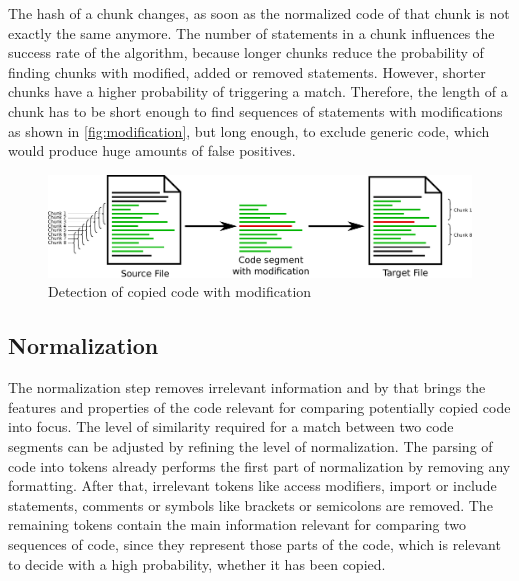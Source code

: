 The hash of a chunk changes, as soon as the normalized code of that chunk is not exactly the same anymore. 
The number of statements in a chunk influences the success rate of the algorithm, because longer chunks reduce the probability of finding chunks with modified, added or removed statements.
However, shorter chunks have a higher probability of triggering a match.
Therefore, the length of a chunk has to be short enough to find sequences of statements with modifications as shown in \autoref{fig:modification}, but long enough, to exclude generic code, which would produce huge amounts of false positives.

\begin{figure}[h]
	\centering
	\includegraphics[width=\linewidth]{figures/modification.pdf}
	\caption{Detection of copied code with modification}\label{fig:modification}
\end{figure}

\subsection{Normalization}\label{section:approach/creating_index/normalization}
The normalization step removes irrelevant information and by that brings the features and properties of the code relevant for comparing potentially copied code into focus.
The level of similarity required for a match between two code segments can be adjusted by refining the level of normalization.
The parsing of code into tokens already performs the first part of normalization by removing any formatting.
After that, irrelevant tokens like access modifiers, import or include statements, comments or symbols like brackets or semicolons are removed.
The remaining tokens contain the main information relevant for comparing two sequences of code, since they represent those parts of the code, which is relevant to decide with a high probability, whether it has been copied.

